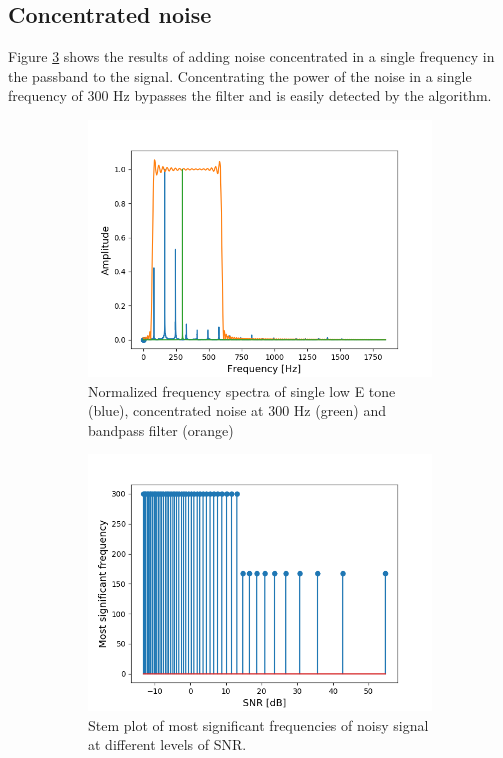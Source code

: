 \subsection{Concentrated noise}
Figure \ref{fig:concentrated_noise} shows the results of adding noise concentrated in a single frequency in the passband to the signal. Concentrating the power of the noise in a single frequency of 300 Hz bypasses the filter and is easily detected by the algorithm.
\begin{figure}[H]
\begin{subfigure}{0.49\textwidth}
\centering
\includegraphics[width=\textwidth]{figures/SNR/concentrated_spectrum.png}
\caption{Normalized frequency spectra of single low E tone (blue), concentrated noise at 300 Hz (green) and bandpass filter (orange)}
\label{fig:concentrated_spectrum}
\end{subfigure}
\begin{subfigure}{0.49\textwidth}
\centering
\includegraphics[width=\textwidth]{figures/SNR/concentrated_stem.png}
\caption{Stem plot of most significant frequencies of noisy signal at different levels of SNR.}
\label{fig:concentrated_stem}
\end{subfigure}
\caption{}
\label{fig:concentrated_noise}
\end{figure}
